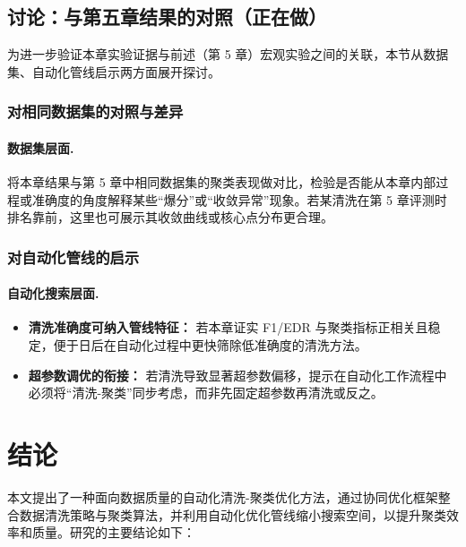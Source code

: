 \documentclass[10pt]{article} %
\numberwithin{equation}{section}
\begin{document}
\subsection{讨论：与第五章结果的对照（正在做）}
\label{sec:discussion}

为进一步验证本章实验证据与前述（第 5 章）宏观实验之间的关联，本节从数据集、自动化管线启示两方面展开探讨。

\subsubsection{对相同数据集的对照与差异}
\label{subsec:discussion_data}

\paragraph{数据集层面.}
将本章结果与第 5 章中相同数据集的聚类表现做对比，检验是否能从本章内部过程或准确度的角度解释某些“爆分”或“收敛异常”现象。若某清洗在第 5 章评测时排名靠前，这里也可展示其收敛曲线或核心点分布更合理。

\subsubsection{对自动化管线的启示}
\label{subsec:discussion_automl}

\paragraph{自动化搜索层面.}
\begin{itemize}
    \item \textbf{清洗准确度可纳入管线特征：}
    若本章证实 F1/EDR 与聚类指标正相关且稳定，便于日后在自动化过程中更快筛除低准确度的清洗方法。
    \item \textbf{超参数调优的衔接：}
    若清洗导致显著超参数偏移，提示在自动化工作流程中必须将“清洗-聚类”同步考虑，而非先固定超参数再清洗或反之。
\end{itemize}



\section{结论}
\label{sec:conclusion}

本文提出了一种面向数据质量的自动化清洗-聚类优化方法，通过协同优化框架整合数据清洗策略与聚类算法，并利用自动化优化管线缩小搜索空间，以提升聚类效率和质量。研究的主要结论如下：
\end{document}
